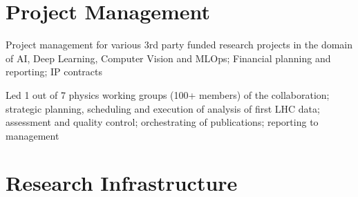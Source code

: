 \documentclass[10pt,a4paper,sans]{moderncv}
\begin{document}
%
\section{Project Management}

{Project management for various 3rd party funded research projects in the domain of AI, Deep Learning, Computer Vision and MLOps; Financial planning and reporting; IP contracts}

{Led 1 out of 7 physics working groups (100+ members) of the collaboration; strategic planning, scheduling and execution of analysis of first LHC data; assessment and quality control; orchestrating of publications; reporting to management}




%
\section{Research Infrastructure}


\end{document}
